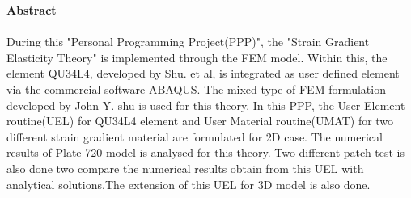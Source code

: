 \documentclass[12pt]{article}
\begin{document}
	\clearpage
    \textbf{\LARGE Abstract}\\
    \\
    { \large During this "Personal Programming Project(PPP)", the "Strain Gradient Elasticity Theory" is implemented through the FEM model. Within this, the element QU34L4, developed by Shu. et al, is integrated as user defined element via the commercial software ABAQUS. The mixed type of FEM formulation developed by John Y. shu is used for this theory.
    In this PPP, the User Element routine(UEL) for QU34L4 element and User Material routine(UMAT) for two different strain gradient material are formulated for 2D case. The numerical results of Plate-720 model is analysed for this theory. Two different patch test is also done two compare the numerical results obtain from this UEL with analytical solutions.The extension of this UEL for 3D model is also done.}




    \newpage
    	\listoffigures
    	\listoftables
    \clearpage
    \tableofcontents
    \clearpage
\end{document}
